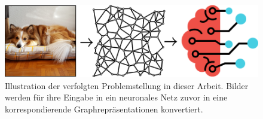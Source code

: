 \begin{figure}[t]
\centering
\includegraphics[width=\textwidth]{bilder/problemstellung.png}
\caption[Problemstellung]{Illustration der verfolgten Problemstellung in dieser Arbeit.
Bilder werden für ihre Eingabe in ein neuronales Netz zuvor in eine korrespondierende Graphrepräsentationen konvertiert.}
\label{fig:problemstellung}
\end{figure}

